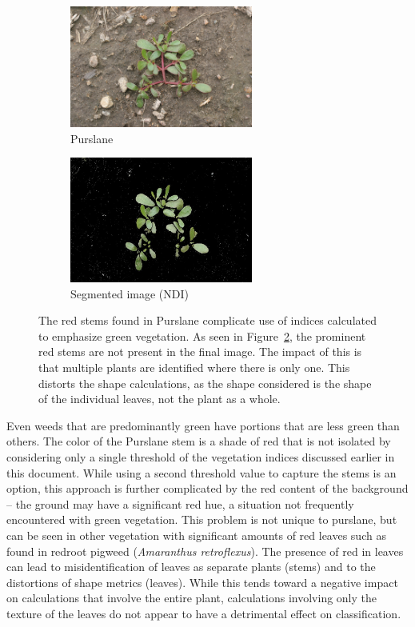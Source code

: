 \documentclass[letterpaper]{report}
\begin{document}
\begin{figure}[h!]
	\centering
	\begin{subfigure}[h]{.40\textwidth}
		\centering
		\includegraphics[width=6cm]{./figures/purslane.png}
		\caption{Purslane}
		\label{fig:purslane}
	\end{subfigure}
	\begin{subfigure}[h]{.40\textwidth}
		\centering
		\includegraphics[width=6cm]{./figures/purslane-segmented.jpg}
		\caption{Segmented image (NDI)}
		\label{fig:purslane-segmented}
	\end{subfigure}
	\caption[Color problems complicate segmentation]{The red stems found in Purslane complicate use of indices calculated to emphasize green vegetation. As seen in Figure~\ref{fig:purslane-segmented}, the prominent red stems are not present in the final image. The impact of this is that multiple plants are identified where there is only one. This distorts the shape calculations, as the shape considered is the shape of the individual leaves, not the plant as a whole.}
	\label{fig:segmentation-problem}
\end{figure}

Even weeds that are predominantly green have portions that are less green than others. The color of the Purslane stem is a shade of red that is not isolated by considering only a single threshold of the vegetation indices discussed earlier in this document. While using a second threshold value to capture the stems is an option, this approach is further complicated by the red content of the background -- the ground may have a significant red hue, a situation not frequently encountered with green vegetation. This problem is not unique to purslane, but can be seen in other vegetation with significant amounts of red leaves such as found in redroot pigweed (\textit{Amaranthus retroflexus}).  The presence of red in leaves can lead to misidentification of leaves as separate plants (stems) and to the distortions of shape metrics (leaves). While this tends toward a negative impact on calculations that involve the entire plant, calculations involving only the texture of the leaves do not appear to have a detrimental effect on classification.
\end{document}
